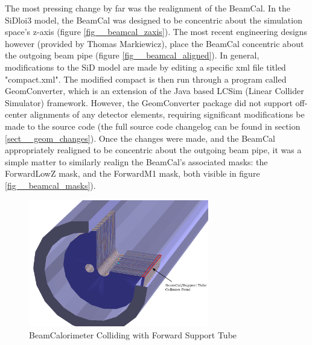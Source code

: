 \documentclass{report}
\begin{document}
            The most pressing change by far was the realignment of the BeamCal. In the SiDloi3 model, the BeamCal was designed to be concentric about the simulation space's z-axis (figure \ref{fig__beamcal_zaxis}). The most recent engineering designs however (provided by Thomas Markiewicz), place the BeamCal concentric about the outgoing beam pipe (figure \ref{fig__beamcal_aligned}). In general, modifications to the SiD model are made by editing a specific xml file titled "compact.xml". The modified compact is then run through a program called GeomConverter, which is an extension of the Java based LCSim (Linear Collider Simulator) framework. However, the GeomConverter package did not support off-center alignments of any detector elements, requiring significant modifications be made to the source code (the full source code changelog can be found in section \ref{sect__geom_changes}). Once the changes were made, and the BeamCal appropriately realigned to be concentric about the outgoing beam pipe, it was a simple matter to similarly realign the BeamCal's associated masks: the ForwardLowZ mask, and the ForwardM1 mask, both visible in figure \ref{fig__beamcal_masks}). 

            \begin{figure}[h] 
                \includegraphics[width=0.7\textwidth]{beamcal_collide}
                \centering
                \caption{BeamCalorimeter Colliding with Forward Support Tube}
                \label{fig__beamcal_collide}
            \end{figure}
\end{document}
